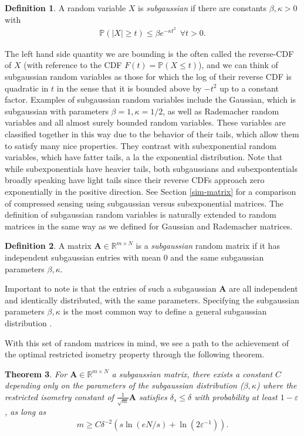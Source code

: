 \documentclass[12pt,a4paper]{amsart}
\numberwithin{equation}{section}
\theoremstyle{plain}
\newtheorem{Th}{Theorem}[section]
\theoremstyle{definition}
\newtheorem{Def}[Th]{Definition}
\newcommand{\BR}{\mathbb R}
\newcommand{\BP}{\mathbb P}
\newcommand{\bdA}{\mathbf{A}}
\begin{document}
\begin{Def} A random variable $X$ is \textit{subgaussian} if there are constants $\beta,\kappa>0$ with
\begin{align}
    \BP(|X|\geq t)\leq\beta e^{-\kappa t^2} \ \ \forall t>0.
\end{align}
\end{Def}

The left hand side quantity we are bounding is the often called the reverse-CDF of $X$ (with reference to the CDF $F(t)=\BP(X\leq t)$), and we can think of subgaussian random variables as those for which the log of their reverse CDF is quadratic in $t$ in the sense that it is bounded above by $-t^2$ up to a constant factor. Examples of subgaussian random variables include the Gaussian, which is subgaussian with parameters $\beta=1,\kappa=1/2$, as well as Rademacher random variables and all almost surely bounded random variables. These variables are classified together in this way due to the behavior of their tails, which allow them to satisfy many nice properties. They contrast with subexponential random variables, which have fatter tails, a la the exponential distribution. Note that while subexponentials have heavier tails, both subgaussians and subexpontentials broadly speaking have light tails since their reverse CDFs approach zero exponentially in the positive direction. See Section \ref{sim-matrix} for a comparison of compressed sensing using subgaussian versus subexponential matrices. The definition of subgaussian random variables is naturally extended to random matrices in the same way as we defined for Gaussian and Rademacher matrices.

\begin{Def}\label{subgaussian} A matrix $\bdA\in\BR^{m\times N}$ is a \textit{subgaussian} random matrix if it has independent subgaussian entries with mean 0 and the same subgaussian parameters $\beta,\kappa$.
\end{Def}

Important to note is that the entries of such a subgaussian $\bdA$ are all independent and identically distributed, with the same parameters. Specifying the subgaussian parameters $\beta,\kappa$ is the most common way to define a general subgaussian distribution \cite{fou-rau}.

With this set of random matrices in mind, we see a path to the achievement of the optimal restricted isometry property through the following theorem.

\begin{Th}\label{rip-subg} For $\bdA\in\BR^{m\times N}$ a subgaussian matrix, there exists a constant $C$ depending only on the parameters of the subgaussian distribution ($\beta,\kappa$) where the restricted isometry constant of $\frac{1}{\sqrt{m}}\bdA$ satisfies $\delta_s\leq\delta$ with probability at least $1-\varepsilon$, as long as
\begin{align}
    m\geq C\delta^{-2}(s\ln(eN/s)+\ln(2\varepsilon^{-1})).
\end{align}
\end{Th}
\end{document}
